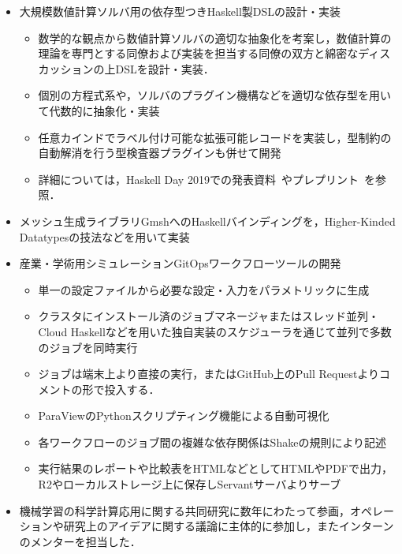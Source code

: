 \documentclass[a4j]{ltjsarticle}
\begin{document}
\begin{refsection}
\begin{itemize}
  \item 大規模数値計算ソルバ用の依存型つきHaskell製DSLの設計・実装
  \begin{itemize}
    \item 数学的な観点から数値計算ソルバの適切な抽象化を考案し，数値計算の理論を専門とする同僚および実装を担当する同僚の双方と綿密なディスカッションの上DSLを設計・実装．
    \item 個別の方程式系や，ソルバのプラグイン機構などを適切な依存型を用いて代数的に抽象化・実装
    \item 任意カインドでラベル付け可能な拡張可能レコードを実装し，型制約の自動解消を行う型検査器プラグインも併せて開発
    \item 詳細については，Haskell Day 2019での発表資料~\cite{ISHII:2019hd-ja}やプレプリント~\cite{ISHII:2021wt}を参照．
  \end{itemize}
  \item メッシュ生成ライブラリGmshへのHaskellバインディングを，Higher-Kinded Datatypesの技法などを用いて実装
  \item 産業・学術用シミュレーションGitOpsワークフローツールの開発
    \begin{itemize}
    \item 単一の設定ファイルから必要な設定・入力をパラメトリックに生成
    \item クラスタにインストール済のジョブマネージャまたはスレッド並列・Cloud Haskellなどを用いた独自実装のスケジューラを通じて並列で多数のジョブを同時実行
    \item ジョブは端末上より直接の実行，またはGitHub上のPull Requestよりコメントの形で投入する．
    \item ParaViewのPythonスクリプティング機能による自動可視化
    \item 各ワークフローのジョブ間の複雑な依存関係はShakeの規則により記述
    \item 実行結果のレポートや比較表をHTMLなどとしてHTMLやPDFで出力，R2やローカルストレージ上に保存しServantサーバよりサーブ
    \end{itemize}
  \item 機械学習の科学計算応用に関する共同研究に数年にわたって参画，オペレーションや研究上のアイデアに関する議論に主体的に参加し，またインターンのメンターを担当した．
\end{itemize}

\printbibliography[title={職歴欄参考文献},heading=subbibliography]

\end{refsection}
\end{document}
